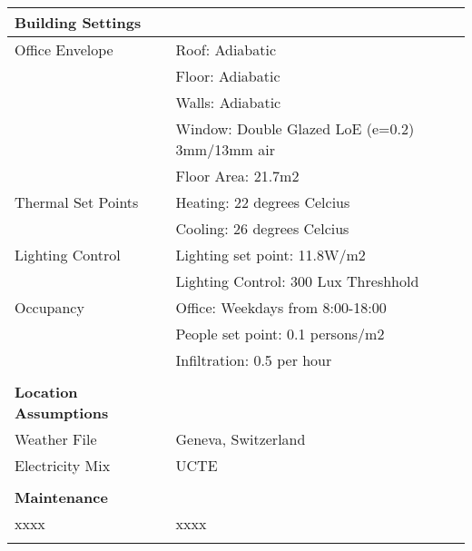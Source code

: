 \begin{table}[H]
\centering
\begin{tabular}{ll}

\textbf{Building Settings}    &                                                \\
\hline
Office Envelope               & Roof: Adiabatic                                \\
                              & Floor: Adiabatic                               \\
                              & Walls: Adiabatic                               \\
                              & Window: Double Glazed LoE (e=0.2) 3mm/13mm air \\
                              & Floor Area: 21.7m2                             \\
\hline                           
Thermal Set Points            & Heating: 22 degrees Celcius                    \\
                              & Cooling: 26 degrees Celcius                    \\
\hline
Lighting Control              & Lighting set point: 11.8W/m2                   \\
                              & Lighting Control: 300 Lux Threshhold           \\
\hline
Occupancy                     & Office: Weekdays from 8:00-18:00               \\
                              & People set point: 0.1 persons/m2               \\
                              & Infiltration: 0.5 per hour                     \\
                              &                                                \\

\textbf{Location Assumptions} &                                                \\
\hline
Weather File                  & Geneva, Switzerland                            \\
Electricity Mix               & UCTE                                           \\
                              &                                                \\

\textbf{Maintenance}          &                                                \\
\hline
xxxx                          & xxxx                                           \\
                              &                                                \\


\end{tabular}
\end{table}

